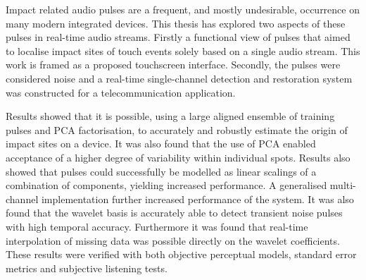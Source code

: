 


\begin{thesissummary}
Impact related audio pulses are a frequent, and mostly undesirable, occurrence on many modern integrated devices. This thesis has explored two aspects of these pulses in real-time audio streams. Firstly a functional view of pulses that aimed to localise impact sites of touch events solely based on a single audio stream. This work is framed as a proposed touchscreen interface. Secondly, the pulses were considered noise and a real-time single-channel detection and restoration system was constructed for a telecommunication application. 

Results showed that it is possible, using a large aligned ensemble of training pulses and PCA factorisation, to accurately and robustly estimate the origin of impact sites on a device. It was also found that the use of PCA enabled acceptance of a higher degree of variability within individual spots. Results also showed that pulses could successfully be modelled as linear scalings of a combination of components, yielding increased performance. A generalised multi-channel implementation further increased performance of the system. It was also found that the wavelet basis is accurately able to detect transient noise pulses with high temporal accuracy. Furthermore it was found that real-time interpolation of missing data was possible directly on the wavelet coefficients. These results were verified with both objective perceptual models, standard error metrics and subjective listening tests.



\end{thesissummary}




